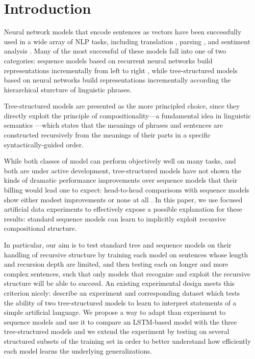 \section{Introduction}\label{sec:intro}

Neural network models that encode sentences as vectors have been successfully used in a wide array of NLP tasks, including translation \cite{sutskever2014sequence}, parsing \cite{dyer2015transition}, and sentiment analysis \cite{tai2015improved}. Many of the most successful of these models fall into one of two categories: sequence models based on recurrent neural networks build representations incrementally from left to right \cite{elman1990finding,sutskever2014sequence}, while tree-structured models based on  neural networks \cite{goller1996learning,socher2011semi} build representations incrementally according the hierarchical sturcture of linguistic phrases.

Tree-structured models are presented as the more principled choice, since they directly exploit the principle of compositionality---a fundamental idea in linguistic semantics \cite{Partee84,Janssen97}---which states that the meanings of phrases and sentences are constructed recursively from the meanings of their parts in a specific syntactically-guided order.

While both classes of model can perform objectively well on many tasks, and both are under active development, tree-structured models have not shown the kinds of dramatic performance improvements over sequence models that their billing would lead one to expect: head-to-head comparisons with sequence models show either modest improvements \cite{tai2015improved} or none at all \cite{li2015tree}. 
In this paper, we use focused artificial data experiments to effectively expose a possible explanation for these results: standard sequence models can learn to implicitly exploit recursive compositional structure.

In particular, our aim is to test standard tree and sequence models on their handling of recursive structure by training each model on sentences whose length and recursion depth are limited, and then testing each on longer and more complex sentences, such that only models that recognize and exploit the recursive structure will be able to succeed. An existing experimental design meets this criterion nicely:  describe an experiment and corresponding dataset which tests the ability of two tree-structured models to learn to interpret statements of a simple artificial language. We propose a way to adapt than experiment to sequence models and use it to compare an LSTM-based model with the three tree-structured models and we extend the experiment by testing on several structured subsets of the training set in order to better understand how efficiently each model learns the underlying generalizations.

